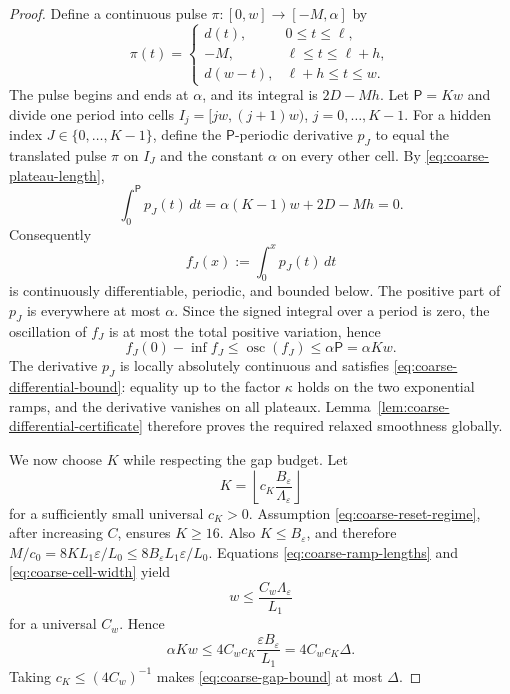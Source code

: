 \documentclass[11pt,a4paper]{article}
\newcommand{\eps}{\varepsilon}
\theoremstyle{remark}
\begin{document}
\begin{proof}
Define a continuous pulse $\pi:[0,w]\to[-M,\alpha]$ by
\begin{equation}
 \pi(t)=
 \begin{cases}
  d(t),&0\le t\le\ell,\\
  -M,&\ell\le t\le\ell+h,\\
  d(w-t),&\ell+h\le t\le w.
 \end{cases}
 \label{eq:coarse-pulse}
\end{equation}
The pulse begins and ends at $\alpha$, and its integral is $2D-Mh$.
Let ${\mathsf P}=Kw$ and divide one period into cells
$I_j=[jw,(j+1)w)$, $j=0,\ldots,K-1$.  For a hidden index
$J\in\{0,\ldots,K-1\}$, define the ${\mathsf P}$-periodic derivative
$p_J$ to equal the translated pulse $\pi$ on $I_J$ and the constant
$\alpha$ on every other cell.  By \eqref{eq:coarse-plateau-length},
\begin{equation}
 \int_0^{\mathsf P}p_J(t)\,dt
 =\alpha(K-1)w+2D-Mh=0.
 \label{eq:coarse-zero-mean}
\end{equation}
Consequently
\begin{equation}
 f_J(x):=\int_0^x p_J(t)\,dt
 \label{eq:coarse-objective}
\end{equation}
is continuously differentiable, periodic, and bounded below.  The positive
part of $p_J$ is everywhere at most $\alpha$.  Since the signed integral over
a period is zero, the oscillation of $f_J$ is at most the total positive
variation, hence
\begin{equation}
 f_J(0)-\inf f_J
 \le \operatorname{osc}(f_J)
 \le \alpha {\mathsf P}=\alpha Kw.
 \label{eq:coarse-gap-bound}
\end{equation}
The derivative $p_J$ is locally absolutely continuous and satisfies
\eqref{eq:coarse-differential-bound}: equality up to the factor $\kappa$
holds on the two exponential ramps, and the derivative vanishes on all
plateaux.  Lemma~\ref{lem:coarse-differential-certificate} therefore proves
the required relaxed smoothness globally.

We now choose $K$ while respecting the gap budget.  Let
\begin{equation}
 K=\left\lfloor c_K\frac{B_\eps}{\Lambda_\eps}\right\rfloor
 \label{eq:coarse-K-choice}
\end{equation}
for a sufficiently small universal $c_K>0$.  Assumption
\eqref{eq:coarse-reset-regime}, after increasing $C$, ensures $K\ge16$.
Also $K\le B_\eps$, and therefore
$M/c_0=8K L_1\eps/L_0\le8B_\eps L_1\eps/L_0$.
Equations \eqref{eq:coarse-ramp-lengths} and
\eqref{eq:coarse-cell-width} yield
\begin{equation}
 w\le \frac{C_w\Lambda_\eps}{L_1}
 \label{eq:coarse-width-log}
\end{equation}
for a universal $C_w$.  Hence
\[
 \alpha Kw
 \le 4C_wc_K\frac{\eps B_\eps}{L_1}
 =4C_wc_K\Delta.
\]
Taking $c_K\le(4C_w)^{-1}$ makes
\eqref{eq:coarse-gap-bound} at most $\Delta$.


\end{proof}
\end{document}
